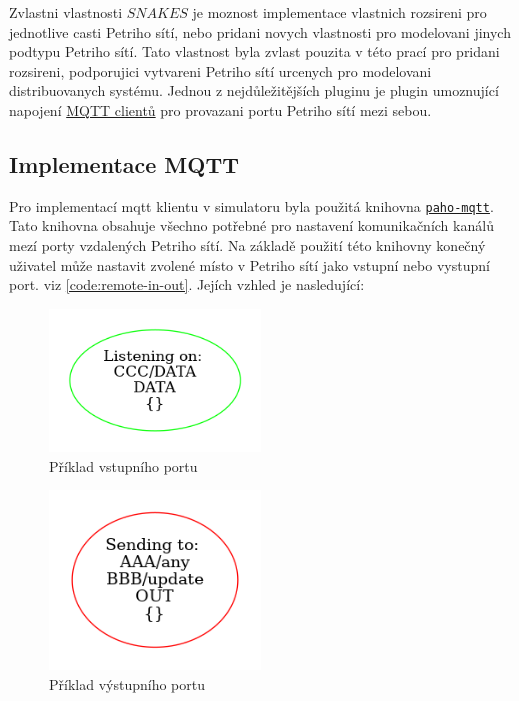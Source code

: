 Zvlastni vlastnosti $SNAKES$ je moznost implementace vlastnich rozsireni pro jednotlive casti Petriho sítí, nebo pridani novych vlastnosti pro modelovani jinych podtypu Petriho sítí. Tato vlastnost byla zvlast pouzita v této prací pro pridani rozsireni, podporujici vytvareni Petriho sítí urcenych pro modelovani distribuovanych systému.
Jednou z nejdůležitějších pluginu je plugin umoznující napojení \hyperref[sec:aplikace-mqtt]{MQTT clientů} pro provazani portu Petriho sítí mezi sebou.

\subsection{Implementace MQTT}
\label{subsec:mqtt_impl}
Pro implementací mqtt klientu v simulatoru byla použitá knihovna \href{https://pypi.org/project/paho-mqtt/}{\texttt{paho-mqtt}}. Tato knihovna obsahuje všechno potřebné pro nastavení komunikačních kanálů mezí porty vzdalených Petriho sítí. Na základě použití této knihovny konečný uživatel může nastavit zvolené místo v Petriho sítí jako vstupní nebo vystupní port. viz \ref{code:remote-in-out}. Jejích vzhled je nasledující:
\begin{figure}[hbt]
  \centering
  \includegraphics[width=0.5\textwidth]{obrazky-figures/port-in.png}
  \caption{Příklad vstupního portu}
  \label{port-in}
\end{figure}

\begin{figure}[hbt]
  \centering
  \includegraphics[width=0.5\textwidth]{obrazky-figures/port-out.png}
  \caption{Příklad výstupního portu}
  \label{port-out}
\end{figure}


